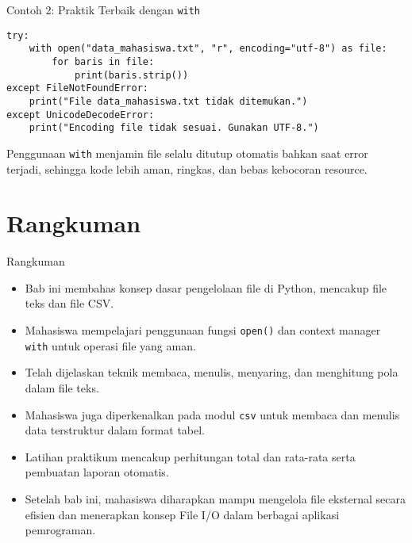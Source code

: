\documentclass[aspectratio=169, table]{beamer}
\begin{document}
\begin{frame}[fragile]{Contoh 2: Praktik Terbaik dengan \texttt{with}}
\vspace{20pt}
\begin{lstlisting}[style=PythonStyle]
try:
    with open("data_mahasiswa.txt", "r", encoding="utf-8") as file:
        for baris in file:
            print(baris.strip())
except FileNotFoundError:
    print("File data_mahasiswa.txt tidak ditemukan.")
except UnicodeDecodeError:
    print("Encoding file tidak sesuai. Gunakan UTF-8.")
\end{lstlisting}

\noindent
Penggunaan \texttt{with} menjamin file selalu ditutup otomatis bahkan saat error terjadi, 
sehingga kode lebih aman, ringkas, dan bebas kebocoran resource.
\end{frame}


\section{Rangkuman}

\begin{frame}{Rangkuman}
\vspace{20pt}
\begin{itemize}
  \item Bab ini membahas konsep dasar pengelolaan file di Python, mencakup file teks dan file CSV.
  \item Mahasiswa mempelajari penggunaan fungsi \texttt{open()} dan context manager \texttt{with} untuk operasi file yang aman.
  \item Telah dijelaskan teknik membaca, menulis, menyaring, dan menghitung pola dalam file teks.
  \item Mahasiswa juga diperkenalkan pada modul \texttt{csv} untuk membaca dan menulis data terstruktur dalam format tabel.
  \item Latihan praktikum mencakup perhitungan total dan rata-rata serta pembuatan laporan otomatis.
  \item Setelah bab ini, mahasiswa diharapkan mampu mengelola file eksternal secara efisien dan menerapkan konsep File I/O dalam berbagai aplikasi pemrograman.
\end{itemize}
\end{frame}
\end{document}
